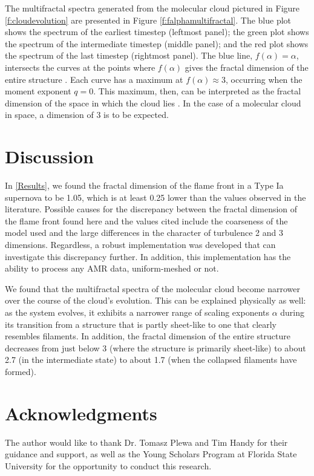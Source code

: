 \documentclass{emulateapj}
\begin{document}
The multifractal spectra generated from the molecular cloud pictured in Figure \ref{f:cloudevolution} are presented in Figure \ref{f:falphamultifractal}. The blue plot shows the spectrum of the earliest timestep (leftmost panel); the green plot shows the spectrum of the intermediate timestep (middle panel); and the red plot shows the spectrum of the last timestep (rightmost panel). The blue line, $f(\alpha) = \alpha $, intersects the curves at the points where $f(\alpha)$ gives the fractal dimension of the entire structure \citep{mandelbrotmultifractal}. Each curve has a maximum at $f(\alpha) \approx 3$, occurring when the moment exponent $q = 0$. This maximum, then, can be interpreted as the fractal dimension of the space in which the cloud lies \citep{Schroeder}. In the case of a molecular cloud in space, a dimension of 3 is to be expected. 

\section{Discussion}\label{Discussion}
In \textsection \ref{Results}, we found the fractal dimension of the flame front in a Type Ia supernova to be 1.05, which is at least 0.25 lower than the values observed in the literature. Possible causes for the discrepancy between the fractal dimension of the flame front found here and the values cited include the coarseness of the model used and the large differences in the character of turbulence 2 and 3 dimensions. Regardless, a robust implementation was developed that can investigate this discrepancy further. In addition, this implementation has the ability to process any AMR data, uniform-meshed or not.
 
We found that the multifractal spectra of the molecular cloud become narrower over the course of the cloud's evolution. This can be explained physically as well: as the system evolves, it exhibits a narrower range of scaling exponents $ \alpha $ during its transition from a structure that is partly sheet-like to one that clearly resembles filaments. In addition, the fractal dimension of the entire structure decreases from just below 3 (where the structure is primarily sheet-like) to about 2.7 (in the intermediate state) to about 1.7 (when the collapsed filaments have formed).

\section{Acknowledgments}\label{s:ack}
The author would like to thank Dr. Tomasz Plewa and Tim Handy for their guidance and support, as well as the Young Scholars Program at Florida State University for the opportunity to conduct this research.
%
%


%
%
%
\end{document}
